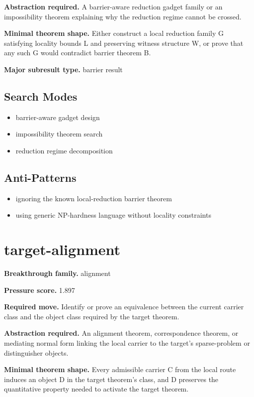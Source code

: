 \documentclass[11pt]{article}
\begin{document}
\textbf{Abstraction required.} A barrier-aware reduction gadget family or an impossibility theorem explaining why the reduction regime cannot be crossed.

\textbf{Minimal theorem shape.} Either construct a local reduction family G satisfying locality bounds L and preserving witness structure W, or prove that any such G would contradict barrier theorem B.

\textbf{Major subresult type.} barrier result

\subsection*{Search Modes}
\begin{itemize}[leftmargin=*,itemsep=0.2em]
\item barrier-aware gadget design
\item impossibility theorem search
\item reduction regime decomposition
\end{itemize}
\subsection*{Anti-Patterns}
\begin{itemize}[leftmargin=*,itemsep=0.2em]
\item ignoring the known local-reduction barrier theorem
\item using generic NP-hardness language without locality constraints
\end{itemize}
\section{target-alignment}
\textbf{Breakthrough family.} alignment

\textbf{Pressure score.} 1.897

\textbf{Required move.} Identify or prove an equivalence between the current carrier class and the object class required by the target theorem.

\textbf{Abstraction required.} An alignment theorem, correspondence theorem, or mediating normal form linking the local carrier to the target's sparse-problem or distinguisher objects.

\textbf{Minimal theorem shape.} Every admissible carrier C from the local route induces an object D in the target theorem's class, and D preserves the quantitative property needed to activate the target theorem.
\end{document}
